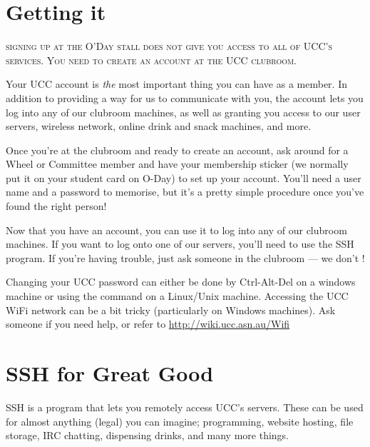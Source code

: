 \label{SetupAccount}



\section{Getting it}

\textsc{signing up at the O'Day stall does not give you access to all of UCC's services. You need to create an account at the UCC clubroom.}

Your UCC account is \emph{the} most important thing you can have as a member. In addition to providing a way for us to communicate with you, the account lets you log into any of our clubroom machines, as well as granting you access to our user servers, wireless network, online drink and snack machines, and more.

Once you're at the clubroom and ready to create an account, ask around for a Wheel or Committee member and have your membership sticker (we normally put it on your student card on O-Day) to set up your account. You'll need a user name and a password to memorise, but it's a pretty simple procedure once you've found the right person!


Now that you have an account, you can use it to log into any of our clubroom machines. If you want to log onto one of our servers, you'll need to use the SSH program. If you're having trouble, just ask someone in the clubroom --- we don't !

Changing your UCC password can either be done by Ctrl-Alt-Del on a windows machine or using the command  on a Linux/Unix machine.
Accessing the UCC WiFi network can be a bit tricky (particularly on Windows machines). Ask someone if you need help, or refer to \url{http://wiki.ucc.asn.au/Wifi}



\section{SSH for Great Good}

SSH is a program that lets you remotely access UCC's servers. These can be used for almost anything (legal) you can imagine; programming, website hosting, file storage, IRC chatting, dispensing drinks, and many more things.

